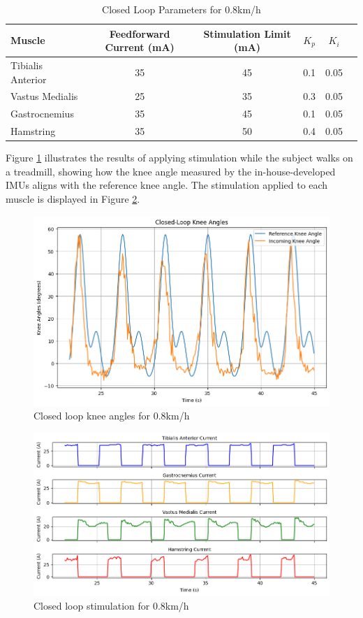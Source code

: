 \begin{table}[H]
\centering
\caption{Closed Loop Parameters for 0.8km/h}
\begin{tabular}{|l|c|c|c|c|c|}
\hline
\textbf{Muscle} & \textbf{Feedforward Current (mA)} & \textbf{Stimulation Limit (mA)} & \textbf{$K_p$} & \textbf{$K_i$} \\ \hline
Tibialis Anterior  & 35 & 45 & 0.1 & 0.05 \\ \hline
Vastus Medialis    & 25 & 35 & 0.3 & 0.05 \\ \hline
Gastrocnemius      & 35 & 45 & 0.1 & 0.05 \\ \hline
Hamstring          & 35 & 50 & 0.4 & 0.05 \\ \hline
\end{tabular}
\label{tab:closed_loop_9}
\end{table}

Figure \ref{fig:cl9ref} illustrates the results of applying stimulation while the subject walks on a treadmill, showing how the knee angle measured by the in-house-developed IMUs aligns with the reference knee angle. The stimulation applied to each muscle is displayed in Figure \ref{fig:cl9stim}.

\begin{figure} [H]
    \centering
    \includegraphics[width=0.95\linewidth]{images/CL9refpng.png}
    \caption{Closed loop knee angles for 0.8km/h}
    \label{fig:cl9ref}
\end{figure}

\begin{figure} [H]
    \centering
    \includegraphics[width=0.9\linewidth]{images/CL9stimpng.png}
    \caption{Closed loop stimulation for 0.8km/h}
    \label{fig:cl9stim}
\end{figure}

